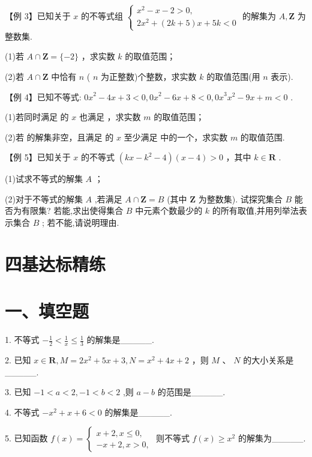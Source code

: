 【例 3】已知关于 $x$ 的不等式组 $\left\{  \begin{array}{l} {x}^{2} - x - 2 > 0, \\  2{x}^{2} + \left( {{2k} + 5}\right) x + {5k} < 0 \end{array}\right.$ 的解集为 $A,\mathbf{Z}$ 为整数集.

(1)若 $A \cap  \mathbf{Z} = \{  - 2\}$ ，求实数 $k$ 的取值范围；

(2)若 $A \cap  \mathbf{Z}$ 中恰有 $n$ ( $n$ 为正整数)个整数，求实数 $k$ 的取值范围(用 $n$ 表示).

【例 4】已知不等式: ${0x}^{2} - {4x} + 3 < 0,{0x}^{2} - {6x} + 8 < 0,{0x}^{3}{x}^{2} - {9x} + m < 0$ .

(1)若同时满足    的 $x$ 也满足  ，求实数 $m$ 的取值范围；

(2)若  的解集非空，且满足    的 $x$ 至少满足      中的一个，求实数 $m$ 的取值范围.

【例 5】已知关于 $x$ 的不等式 $\left( {{kx} - {k}^{2} - 4}\right) \left( {x - 4}\right)  > 0$ ，其中 $k \in  \mathbf{R}$ .

(1)试求不等式的解集 $A$ ；

(2)对于不等式的解集 $A$ ,若满足 $A \cap  \mathbf{Z} = B$ (其中 $\mathbf{Z}$ 为整数集). 试探究集合 $B$ 能否为有限集? 若能,求出使得集合 $B$ 中元素个数最少的 $k$ 的所有取值,并用列举法表示集合 $B$ ; 若不能,请说明理由.

\section*{四基达标精练}

\section*{一、填空题}

1. 不等式 $- \frac{1}{2} < \frac{1}{x} \leq  \frac{1}{3}$ 的解集是\_\_\_\_\_.

2. 已知 $x \in  \mathbf{R},M = 2{x}^{2} + {5x} + 3,N = {x}^{2} + {4x} + 2$ ，则 $M$ 、 $N$ 的大小关系是\_\_\_\_\_.

3. 已知 $- 1 < a < 2, - 1 < b < 2$ ,则 $a - b$ 的范围是\_\_\_\_\_.

4. 不等式 $- {x}^{2} + x + 6 < 0$ 的解集是\_\_\_\_\_.

5. 已知函数 $f\left( x\right)  = \left\{  \begin{array}{l} x + 2,x \leq  0, \\   - x + 2,x > 0, \end{array}\right.$ 则不等式 $f\left( x\right)  \geq  {x}^{2}$ 的解集为\_\_\_\_\_.

